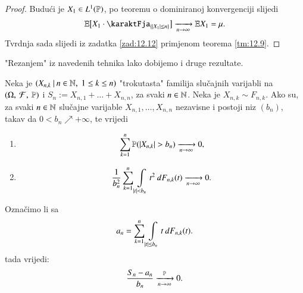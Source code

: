 \begin{proof}
    Budu\' ci je $X_1 \in L^1(\mathbb{P})$, po teoremu o dominiranoj konvergenciji slijedi
    \begin{equation*}
        \masE \big[ X_1 \cdot \karaktFja_{\{ |X_1| \leq n \}} \big] \xrightarrow[n \to \infty]{} \masE X_1 = \mu.
    \end{equation*}
    Tvrdnja sada slijedi iz zadatka \ref{zad:12.12} primjenom teorema \ref{tm:12.9}.
\end{proof}

"Rezanjem" iz navedenih tehnika lako dobijemo i druge rezultate.

\begin{tm}  \label{tm:12.15}
    Neka je $({X_{n, k}} \: | \: {n \in \mathbb{N}, \; 1 \leq k \leq n})$ "trokutasta" familija slu\v cajnih varijabli na $(\Omega, \: \mathcal{F}, \: \mathbb{P})$ i $S_n := X_{n, 1} + \ldots + X_{n, n}$, za svaki $n \in \mathbb{N}$.
    Neka je $X_{n, k} \sim F_{n, k}$.
    Ako su, za svaki $n \in \mathbb{N}$ slu\v cajne varijable $X_{n, 1}, \ldots, X_{n, n}$ nezavisne i postoji niz $(b_n)$, takav da $0 < b_n \nearrow +\infty$, te vrijedi
    \begin{enumerate}[label=(\roman*)]
        \item \label{tm:12.15.1}
        \begin{equation*}
            \sum\limits_{k = 1}^{n} \mathbb{P}({|X_{n, k}| > b_n}) \xrightarrow[n \to \infty]{} 0,
        \end{equation*}
        \item \label{tm:12.15.2}
        \begin{equation*}
            \frac{1}{b_n^2} \sum\limits_{k = 1}^{n} \int\limits_{|t| < b_n} t^2 \: dF_{n, k}(t) \xrightarrow[n \to \infty]{} 0.
        \end{equation*}
    \end{enumerate}
    Ozna\v cimo li sa
    \begin{equation*}
        a_n = \sum\limits_{k = 1}^{n} \int\limits_{|t| \leq b_n} t \: dF_{n, k} (t).
    \end{equation*}
    tada vrijedi:
    \begin{equation*}
        \frac{S_n - a_n}{b_n} \xrightarrow[n \to \infty]{\mathbb{P}} 0.
    \end{equation*}    
\end{tm}

